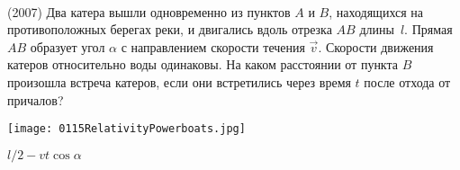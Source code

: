 \begin{ex}
\hspace{0pt} \\
\begin{minipage}{.65\textwidth}
(2007) Два катера вышли одновременно из пунктов $A$ и $B$, находящихся на противоположных берегах реки, и двигались вдоль отрезка $AB$ длины~$l$. 
Прямая $AB$ образует угол $\alpha$ с направлением скорости течения $\vec v$. Скорости движения катеров относительно воды одинаковы. 
На каком расстоянии от пункта $B$ произошла встреча катеров, если они встретились через время $t$ после отхода от причалов?
\end{minipage}
\begin{minipage}{.35\textwidth}
\centering
\texttt{[image: 0115RelativityPowerboats.jpg]}
\end{minipage}
\begin{ans}
$l/2 - vt \cos \alpha$
\end{ans}
\end{ex}
